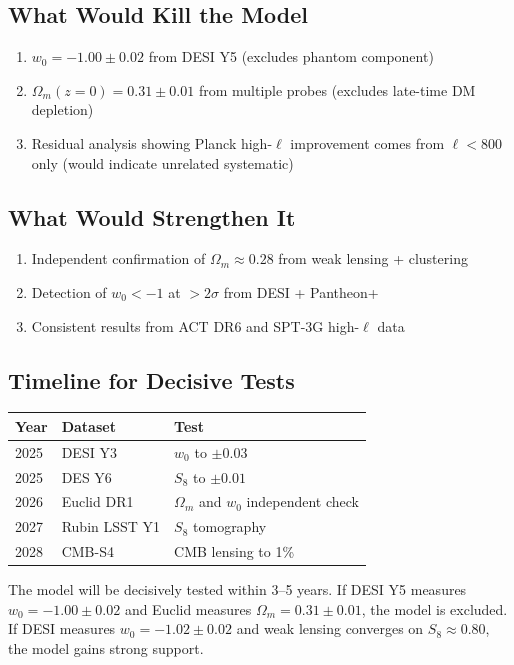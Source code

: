 \documentclass[twocolumn,showpacs,preprintnumbers,amsmath,amssymb,prd]{revtex4-2}
\begin{document}
\subsection{What Would Kill the Model}

\begin{enumerate}
    \item $w_0 = -1.00 \pm 0.02$ from DESI Y5 (excludes phantom component)
    \item $\Omega_m(z=0) = 0.31 \pm 0.01$ from multiple probes (excludes late-time DM depletion)
    \item Residual analysis showing Planck high-$\ell$ improvement comes from $\ell < 800$ only (would indicate unrelated systematic)
\end{enumerate}

\subsection{What Would Strengthen It}

\begin{enumerate}
    \item Independent confirmation of $\Omega_m \approx 0.28$ from weak lensing + clustering
    \item Detection of $w_0 < -1$ at $>2\sigma$ from DESI + Pantheon+
    \item Consistent results from ACT DR6 and SPT-3G high-$\ell$ data
\end{enumerate}

\subsection{Timeline for Decisive Tests}

\begin{center}
\begin{tabular}{lll}
\toprule
Year & Dataset & Test \\
\midrule
2025 & DESI Y3 & $w_0$ to $\pm 0.03$ \\
2025 & DES Y6 & $S_8$ to $\pm 0.01$ \\
2026 & Euclid DR1 & $\Omega_m$ and $w_0$ independent check \\
2027 & Rubin LSST Y1 & $S_8$ tomography \\
2028 & CMB-S4 & CMB lensing to 1\% \\
\bottomrule
\end{tabular}
\end{center}

The model will be decisively tested within 3--5 years. If DESI Y5 measures $w_0 = -1.00 \pm 0.02$ and Euclid measures $\Omega_m = 0.31 \pm 0.01$, the model is excluded. If DESI measures $w_0 = -1.02 \pm 0.02$ and weak lensing converges on $S_8 \approx 0.80$, the model gains strong support.
\end{document}
